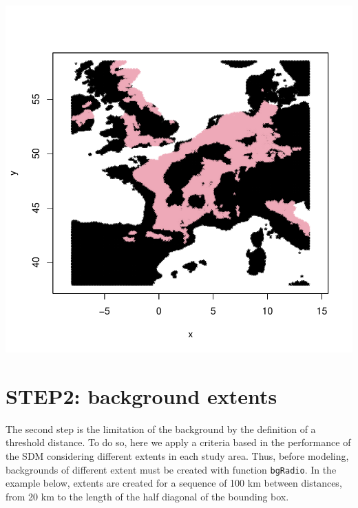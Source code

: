 \documentclass[10pt,a4paper]{report}
\begin{document}
\begin{Schunk}
\end{Schunk}
\includegraphics{mopa-mopa7}


\section{STEP2: background extents}

The second step is the limitation of the background by the definition of a threshold distance.
To do so, here we apply a criteria based in the performance of the SDM considering different extents in each study area. Thus, before modeling, backgrounds of different extent must be created with function \texttt{bgRadio}. In the example below, extents are created for a sequence of 100 km between distances, from 20 km to the length of the half diagonal of the bounding box.
\end{document}
